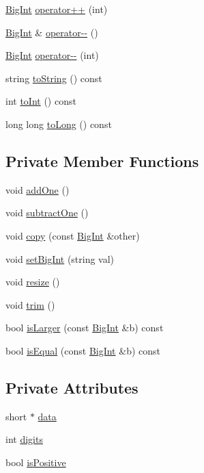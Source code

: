 \begin{DoxyCompactItemize}
\item 
\hyperlink{class_big_int}{Big\+Int} \hyperlink{class_big_int_a7120696c07c413340246a61eb209a541}{operator++} (int)
\item 
\hyperlink{class_big_int}{Big\+Int} \& \hyperlink{class_big_int_aed992537fac59f8c794fc24d10baf199}{operator-\/-\/} ()
\item 
\hyperlink{class_big_int}{Big\+Int} \hyperlink{class_big_int_a6ef5639e9f2cb2226f8611bb39c6c663}{operator-\/-\/} (int)
\item 
string \hyperlink{class_big_int_a947ea3d85937c212c75f58da26e41d00}{to\+String} () const 
\item 
int \hyperlink{class_big_int_a8c5832ca4c93be36a01a0683ed9b9d87}{to\+Int} () const 
\item 
long long \hyperlink{class_big_int_a1a6a8a6deeda3f57b27566027e3c2d4d}{to\+Long} () const 
\end{DoxyCompactItemize}
\subsection*{Private Member Functions}
\begin{DoxyCompactItemize}
\item 
void \hyperlink{class_big_int_a061d5ed012a04d6646c9a6a0e10da544}{add\+One} ()
\item 
void \hyperlink{class_big_int_a4baef860c6adb34f670a868db7fc4482}{subtract\+One} ()
\item 
void \hyperlink{class_big_int_a2881bf9fd6f9310cef0853036d89f8a1}{copy} (const \hyperlink{class_big_int}{Big\+Int} \&other)
\item 
void \hyperlink{class_big_int_a896d3c59d3c4f1e0435d21b2bf50169f}{set\+Big\+Int} (string val)
\item 
void \hyperlink{class_big_int_a4d6ffd94b538c45fa3c4c02e625ba7b7}{resize} ()
\item 
void \hyperlink{class_big_int_a292c19c73cf1198bfb3f64ca093651d2}{trim} ()
\item 
bool \hyperlink{class_big_int_a0963adebab02961555382704df42d708}{is\+Larger} (const \hyperlink{class_big_int}{Big\+Int} \&b) const 
\item 
bool \hyperlink{class_big_int_a5429df4fc70cb4f4af675d4d64280f71}{is\+Equal} (const \hyperlink{class_big_int}{Big\+Int} \&b) const 
\end{DoxyCompactItemize}
\subsection*{Private Attributes}
\begin{DoxyCompactItemize}
\item 
short $\ast$ \hyperlink{class_big_int_af181978224e5a90c5dbd4cbcd3d80379}{data}
\item 
int \hyperlink{class_big_int_a19085d2456cc9b7b79b9ff15b63a2588}{digits}
\item 
bool \hyperlink{class_big_int_aff7539a3ecc2cbc8ab3117ed40f4352c}{is\+Positive}
\end{DoxyCompactItemize}
